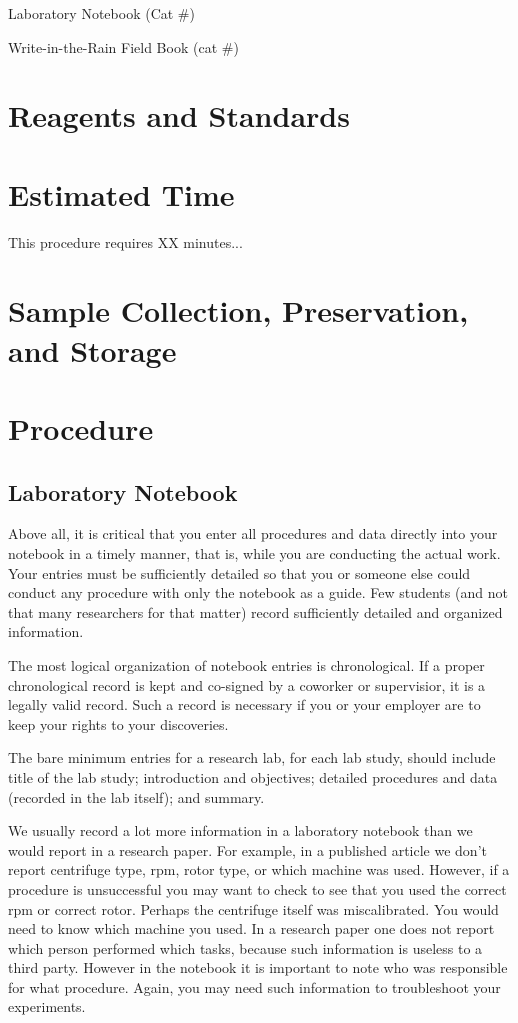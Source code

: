 \documentclass[12pt]{../SOP3_beta}
\begin{document}
\NP Laboratory Notebook (Cat \#)

\NP Write-in-the-Rain Field Book (cat \#)

\section{Reagents and Standards}

\section{Estimated Time}

\NP This procedure requires XX minutes...

\section{Sample Collection, Preservation, and Storage}

\section{Procedure}

\subsection{Laboratory Notebook}

\NP Above all, it is critical that you enter all procedures and data directly into your notebook in a timely manner, that is, while you are conducting the actual work. Your entries must be sufficiently detailed so that you or someone else could conduct any procedure with only the notebook as a guide. Few students (and not that many researchers for that matter) record sufficiently detailed and organized information. 

\NP The most logical organization of notebook entries is chronological. If a proper chronological record is kept and co-signed by a coworker or supervisior, it is a legally valid record. Such a record is necessary if you or your employer are to keep your rights to your discoveries.

\NP The bare minimum entries for a research lab, for each lab study, should include title of the lab study; introduction and objectives; detailed procedures and data (recorded in the lab itself); and summary.

\NP We usually record a lot more information in a laboratory notebook than we would report in a research paper. For example, in a published article we don't report centrifuge type, rpm, rotor type, or which machine was used. However, if a procedure is unsuccessful you may want to check to see that you used the correct rpm or correct rotor. Perhaps the centrifuge itself was miscalibrated. You would need to know which machine you used. In a research paper one does not report which person performed which tasks, because such information is useless to a third party. However in the notebook it is important to note who was responsible for what procedure. Again, you may need such information to troubleshoot your experiments.
\end{document}
